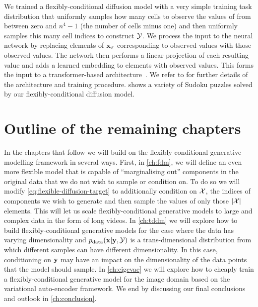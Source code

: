 We trained a flexibly-conditional diffusion model with a very simple training task distribution that uniformly samples how many cells to observe the values of from between zero and $n^4-1$ (the number of cells minus one) and then uniformly samples this many cell indices to construct ${\mathcal{Y}}$. We process the input to the neural network by replacing elements of ${\mathbf{x}}_\sigma$ corresponding to observed values with those observed values. The network then performs a linear projection of each resulting value and adds a learned embedding to elements with observed values. This forms the input to a transformer-based architecture~\citep{vaswani2017attention}. We refer to \citet{weilbach2023graphically} for further details of the architecture and training procedure.  shows a variety of Sudoku puzzles solved by our flexibly-conditional diffusion model.

\section{Outline of the remaining chapters}
In the chapters that follow we will build on the flexibly-conditional generative modelling framework in several ways. First, in \cref{ch:fdm}, we will define an even more flexible model that is capable of ``marginalising out'' components in the original data that we do not wish to sample or condition on. To do so we will modify \cref{eq:flexible-diffusion-target} to additionally condition on ${\mathcal{X}}$, the indices of components we wish to generate and then sample the values of only those $|{\mathcal{X}}|$ elements. This will let us scale flexibly-conditional generative models to large and complex data in the form of long videos. In \cref{ch:tddm} we will explore how to build flexibly-conditional generative models for the case where the data has varying dimensionality and $p_{\rm{data}}({\mathbf{x}} | {\mathbf{y}}, {\mathcal{Y}})$ is a trans-dimensional distribution from which different samples can have different dimensionality. In this case, conditioning on ${\mathbf{y}}$ may have an impact on the dimensionality of the data points that the model should sample. In \cref{ch:cigcvae} we will explore how to cheaply train a flexibly-conditional generative model for the image domain based on the variational auto-encoder framework. We end by discussing our final conclusions and outlook in \cref{ch:conclusion}.
